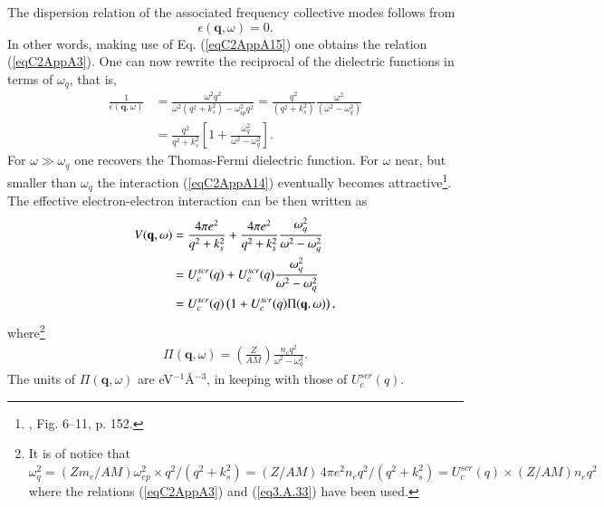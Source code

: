 The dispersion relation of the associated frequency collective modes follows from
\begin{equation}\label{eqC2AppA21}
\epsilon(\mathbf q,\omega)=0.
\end{equation}
In other words, making use of Eq. (\ref{eqC2AppA15}) one obtains the relation (\ref{eqC2AppA3}). One can now rewrite the reciprocal of the dielectric functions in terms of $\omega_{q}$, that is,
\begin{align}\label{eqC2AppA22}
\nonumber \frac{1}{\epsilon(\mathbf q,\omega)}&=\frac{\omega^2q^2}{\omega^2(q^2+k_s^2)-\omega_{ip}^2q^2}=\frac{q^2}{(q^2+k_s^2)}\frac{\omega^2}{(\omega^2-\omega_q^2)}\\
&=\frac{q^2}{q^2+k_s^2}\left[1+\frac{\omega_q^2}{\omega^2-\omega_q^2}\right].
\end{align}
For $\omega\gg \omega_q$ one recovers the Thomas-Fermi dielectric function. For $\omega$ near, but smaller than $\omega_q$ the interaction (\ref{eqC2AppA14}) eventually becomes   attractive\footnote{\cite{Schrieffer:64}, Fig. 6--11, p. 152.}. The effective electron-electron interaction can be then written as
\begin{align}\label{eqC2AppA23}
\nonumber V(\mathbf q,\omega)&=\frac{4\pi  e^2}{q^2+k_s^2}+\frac{4\pi  e^2}{q^2+k_s^2}\frac{\omega_q^2}{\omega^2-\omega_q^2}\\
\nonumber &=U^{scr}_c(q)+U_c^{scr}(q)\frac{\omega_q^2}{\omega^2-\omega_q^2}\\
&=U^{scr}_c(q)\left(1+U^{scr}_c(q)\Pi(\mathbf q,\omega)\right), \idx{Induced pairing interaction!parallel with pairing in superconductors}
\end{align}
where\footnote{It is of notice that $\omega_q^2=\left(Zm_e/AM\right)\omega^2_{ep}\times q^2/(q^2+k_s^2)=(Z/AM)\,4\pi e^2 n_e q^2 /(q^2+k_s^2)=U^{scr}_c(q)\times(Z/AM)n_e q^2$ where the relations (\ref{eqC2AppA3}) and (\ref{eq3.A.33}) have been used.}
\begin{align}\label{eqC2AppA24}
\Pi(\mathbf q,\omega)=\left(\frac{Z}{AM}\right)\frac{n_e q^2}{\omega^2-\omega_q^2}.
\end{align}
The units of $\Pi(\mathbf q,\omega)$ are eV$^{-1}$\AA$^{-3}$, in keeping with those of $U_c^{scr}(q)$.


